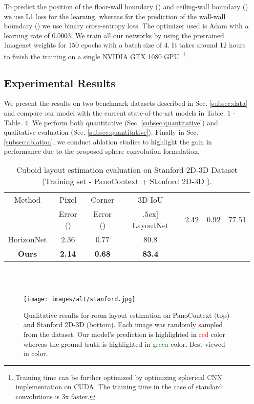 \documentclass[final]{cvpr}
\begin{document}
To predict the position of the floor-wall boundary () and ceiling-wall boundary () we use L1 loss for the learning, whereas for the prediction of the wall-wall boundary () we use binary cross-entropy loss. The optimizer used is Adam with a learning rate of 0.0003. We train all our networks by using the pretrained Imagenet weights for 150 epochs with a batch size of 4. It takes around 12 hours to finish the training on a single NVIDIA GTX 1080 GPU. \footnote{Training time can be further optimized by optimizing spherical CNN implementation on CUDA. The training time in the case of standard convolutions is 3x faster.}





\subsection{Experimental Results}\label{subsec:results}
We present the results on two benchmark datasets described in Sec. \ref{subsec:data} and compare our model with the current state-of-the-art models in Table. 1 - Table. 4.
We perform both quantitative (Sec. \ref{subsec:quantitative}) and qualitative evaluation (Sec. \ref{subsec:quantitative}). Finally in Sec.  \ref{subsec:ablation}, we conduct ablation studies to highlight the gain in performance due to the proposed sphere convolution formulation.


\begin{table}[t]
\centering
 \begin{tabular}{||c c c c||} 
 \hline
 Method & Pixel & Corner & 3D IoU \\ [0.5ex] 
  &Error ()&Error ()&\0.5ex]
 \hline\hline
 LayoutNet \cite{zou2018layoutnet} & 2.42 & 0.92 & 77.51 \\
 \hline
 HorizonNet \cite{sun2019horizonnet} & 2.36 & 0.77 & 80.8 \\ 
 \hline
 \textbf{Ours} & \textbf{2.14} & \textbf{0.68} &  \textbf{83.4}\\ 
 \hline
\end{tabular} \\~\\
\caption{Cuboid layout estimation evaluation on Stanford 2D-3D Dataset \cite{armeni2017joint} (Training set - PanoContext \cite{zhang2014panocontext} + Stanford 2D-3D \cite{armeni2017joint}).}
\label{tab:Table4}
\end{table}




\begin{figure*}[!t]
    \centering
    \texttt{[image: images/alt/stanford.jpg]}
    \caption{Qualitative results for room layout estimation on PanoContext \cite{zhang2014panocontext} (top) and Stanford 2D-3D \cite{armeni2017joint} (bottom). Each image was randomly sampled from the dataset. Our model's prediction is highlighted in \textcolor{red}{red} color whereas the ground truth is highlighted in \textcolor{green}{green} color. Best viewed in color.}
    \label{fig:stanford_Results}
\end{figure*}
\end{document}
